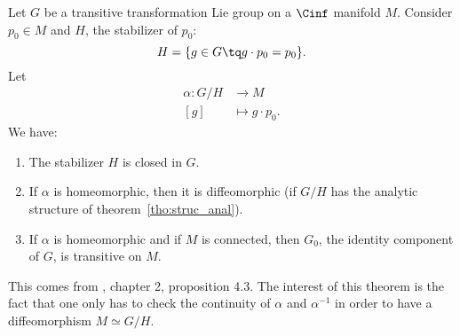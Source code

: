 \begin{proposition}
	Let $G$ be a transitive transformation Lie group on a $\Cinf$ manifold $M$. Consider $p_0\in M$ and $H$, the stabilizer of $p_{0}$:
	\[
		H=\{ g\in G\tq g\cdot p_0=p_0 \}.
	\]
	Let
	\begin{equation}
		\begin{aligned}
			\alpha\colon G/H & \to M                 \\
			[g]              & \mapsto g\cdot p_{0}.
		\end{aligned}
	\end{equation}
	We have:
	\begin{enumerate}
		\item The stabilizer $H$ is closed in $G$.
		\item If $\alpha$ is homeomorphic, then it is diffeomorphic (if $G/H$ has the analytic structure of theorem~\ref{tho:struc_anal}).
		\item If $\alpha$ is homeomorphic and if $M$ is connected, then $G_0$, the identity component of $G$, is transitive on $M$.
	\end{enumerate}
	\label{propHelgason4.3}
\end{proposition}

This comes from \cite{Helgason}, chapter 2, proposition 4.3. The interest of this theorem is the fact that one only has to check the continuity of $\alpha$ and $\alpha^{-1}$ in order to have a diffeomorphism $M\simeq G/H$.

